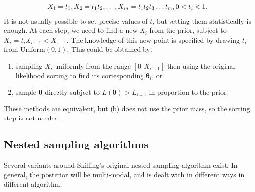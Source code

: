 \documentclass{article}
\begin{document}
\begin{equation}
  X_1 = t_1, X_2 = t_1t_2, \dots, X_m = t_1t_2t_3\dots t_m, 0<t_i<1\textrm.
\end{equation}
%
It is not usually possible to set precise values of $t$, but setting them statistically is enough. At each step, we need to find a new $X_i$ from the prior, subject to $X_i = t_i X_{i-1}<X_{i-1}$. The knowledge of this new point is specified by drawing $t_i$ from $\textrm{Uniform}(0, 1)$. This could be obtained by:
\begin{enumerate}
  \item sampling $X_i$ uniformly from the range $[0, X_{i-1}]$ then using the original likelihood sorting to find its corresponding $\bm\theta_i$, or
  \item sample $\bm\theta$ directly subject to $L(\bm\theta)>L_{i-1}$ in proportion to the prior.
\end{enumerate}

These methods are equivalent, but (b) does not use the prior mass, so the sorting step is not needed.

\newpage
\subsection{Nested sampling algorithms}

Several variants around Skilling's original nested sampling algorithm exist. In general, the posterior will be multi-modal, and is dealt with in different ways in different algorithm. 
\end{document}
